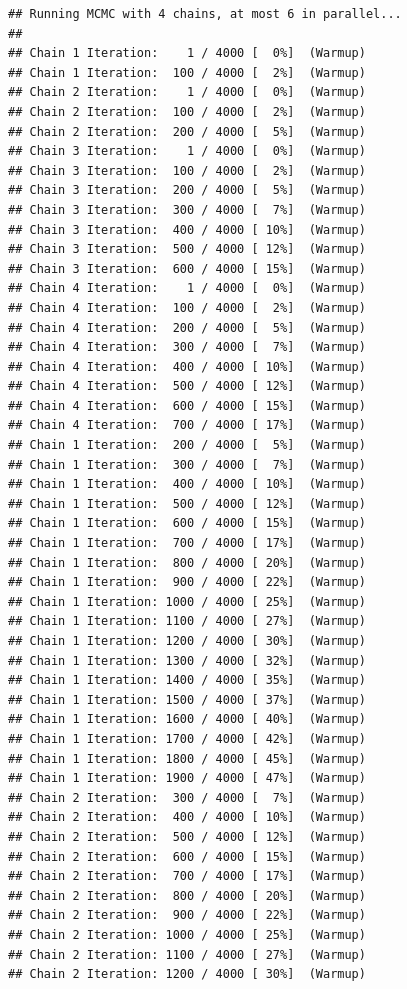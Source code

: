 \documentclass[
]{article}
\begin{document}
\begin{verbatim}
## Running MCMC with 4 chains, at most 6 in parallel...
## 
## Chain 1 Iteration:    1 / 4000 [  0%]  (Warmup) 
## Chain 1 Iteration:  100 / 4000 [  2%]  (Warmup) 
## Chain 2 Iteration:    1 / 4000 [  0%]  (Warmup) 
## Chain 2 Iteration:  100 / 4000 [  2%]  (Warmup) 
## Chain 2 Iteration:  200 / 4000 [  5%]  (Warmup) 
## Chain 3 Iteration:    1 / 4000 [  0%]  (Warmup) 
## Chain 3 Iteration:  100 / 4000 [  2%]  (Warmup) 
## Chain 3 Iteration:  200 / 4000 [  5%]  (Warmup) 
## Chain 3 Iteration:  300 / 4000 [  7%]  (Warmup) 
## Chain 3 Iteration:  400 / 4000 [ 10%]  (Warmup) 
## Chain 3 Iteration:  500 / 4000 [ 12%]  (Warmup) 
## Chain 3 Iteration:  600 / 4000 [ 15%]  (Warmup) 
## Chain 4 Iteration:    1 / 4000 [  0%]  (Warmup) 
## Chain 4 Iteration:  100 / 4000 [  2%]  (Warmup) 
## Chain 4 Iteration:  200 / 4000 [  5%]  (Warmup) 
## Chain 4 Iteration:  300 / 4000 [  7%]  (Warmup) 
## Chain 4 Iteration:  400 / 4000 [ 10%]  (Warmup) 
## Chain 4 Iteration:  500 / 4000 [ 12%]  (Warmup) 
## Chain 4 Iteration:  600 / 4000 [ 15%]  (Warmup) 
## Chain 4 Iteration:  700 / 4000 [ 17%]  (Warmup) 
## Chain 1 Iteration:  200 / 4000 [  5%]  (Warmup) 
## Chain 1 Iteration:  300 / 4000 [  7%]  (Warmup) 
## Chain 1 Iteration:  400 / 4000 [ 10%]  (Warmup) 
## Chain 1 Iteration:  500 / 4000 [ 12%]  (Warmup) 
## Chain 1 Iteration:  600 / 4000 [ 15%]  (Warmup) 
## Chain 1 Iteration:  700 / 4000 [ 17%]  (Warmup) 
## Chain 1 Iteration:  800 / 4000 [ 20%]  (Warmup) 
## Chain 1 Iteration:  900 / 4000 [ 22%]  (Warmup) 
## Chain 1 Iteration: 1000 / 4000 [ 25%]  (Warmup) 
## Chain 1 Iteration: 1100 / 4000 [ 27%]  (Warmup) 
## Chain 1 Iteration: 1200 / 4000 [ 30%]  (Warmup) 
## Chain 1 Iteration: 1300 / 4000 [ 32%]  (Warmup) 
## Chain 1 Iteration: 1400 / 4000 [ 35%]  (Warmup) 
## Chain 1 Iteration: 1500 / 4000 [ 37%]  (Warmup) 
## Chain 1 Iteration: 1600 / 4000 [ 40%]  (Warmup) 
## Chain 1 Iteration: 1700 / 4000 [ 42%]  (Warmup) 
## Chain 1 Iteration: 1800 / 4000 [ 45%]  (Warmup) 
## Chain 1 Iteration: 1900 / 4000 [ 47%]  (Warmup) 
## Chain 2 Iteration:  300 / 4000 [  7%]  (Warmup) 
## Chain 2 Iteration:  400 / 4000 [ 10%]  (Warmup) 
## Chain 2 Iteration:  500 / 4000 [ 12%]  (Warmup) 
## Chain 2 Iteration:  600 / 4000 [ 15%]  (Warmup) 
## Chain 2 Iteration:  700 / 4000 [ 17%]  (Warmup) 
## Chain 2 Iteration:  800 / 4000 [ 20%]  (Warmup) 
## Chain 2 Iteration:  900 / 4000 [ 22%]  (Warmup) 
## Chain 2 Iteration: 1000 / 4000 [ 25%]  (Warmup) 
## Chain 2 Iteration: 1100 / 4000 [ 27%]  (Warmup) 
## Chain 2 Iteration: 1200 / 4000 [ 30%]  (Warmup) 

\end{verbatim}
\end{document}
